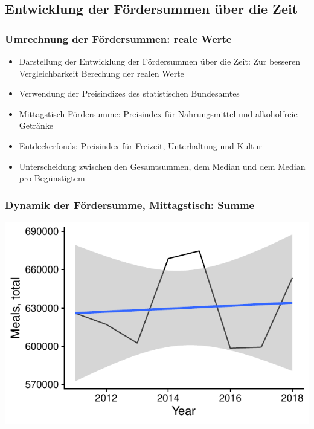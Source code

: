 \subsection{Entwicklung der Fördersummen über die Zeit}

\begin{frame}[fragile]
\frametitle{Umrechnung der Fördersummen: reale Werte}
\begin{itemize}
  \item{Darstellung der Entwicklung der Fördersummen über die Zeit: Zur besseren Vergleichbarkeit Berechung der realen Werte}
  \item{Verwendung der Preisindizes des statistischen Bundesamtes}
  \item{Mittagstisch Fördersumme: Preisindex für Nahrungsmittel und alkoholfreie Getränke}
  \item{Entdeckerfonds: Preisindex für Freizeit, Unterhaltung und Kultur}
  \item{Unterscheidung zwischen den Gesamtsummen, dem Median und dem Median pro Begünstigtem}
\end{itemize}
\end{frame}

\begin{frame}[fragile]
\frametitle{Dynamik der Fördersumme, Mittagstisch: Summe}



{\centering \includegraphics[width=\maxwidth]{figure/beamer-FundamentalDynamicsMealsTotal-1} 

}



\end{frame}

